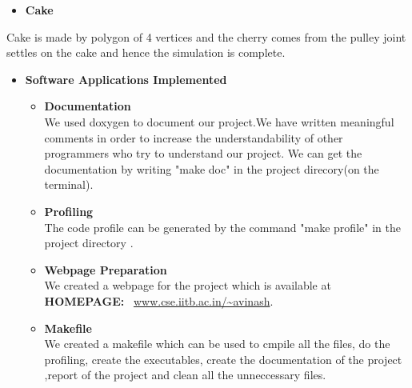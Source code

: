 \documentclass{article}
\begin{document}
\begin{itemize}
        \begin{itemize}[label=$\blacksquare$] \vspace{0cm}
            \item \textbf{\Large Cake} 
        \end{itemize}
        \large Cake is made by polygon of 4 vertices and the cherry comes from the pulley joint settles on the cake and hence the simulation is complete.\\ \vspace{0.65 cm}
    \end{itemize}

\begin{itemize}
	\item[] \textbf{\LARGE Software Applications Implemented} \\
        \begin{itemize}[label=$\blacksquare$] \vspace{0cm}

            \item \textbf{\Large Documentation }\\
            \large We used doxygen to document our project.We have written meaningful comments in order to increase the understandability of other programmers who try to understand our project. We can get the documentation by writing "make doc" in the project direcory(on the terminal). \vspace{0.20 cm}

            \item \textbf{\Large Profiling}\\ 
            \large The code profile can be generated by the command "make profile" in the project directory . \vspace{0.20 cm}

            \item \textbf{\Large Webpage Preparation}\\ 
            \large We created a webpage for the project which is available at {\large {\bf HOMEPAGE:} \ \url{www.cse.iitb.ac.in/~avinash}}. \vspace{0.20 cm}

            \item \textbf{\Large Makefile}\\ 
            \large We created a makefile which can be used to cmpile all the files, do the profiling, create the executables, create the documentation of the project ,report of the project and clean all the unneccessary files. \vspace{0.2 cm}


 \end{itemize}
        \end{itemize}
\end{document}
